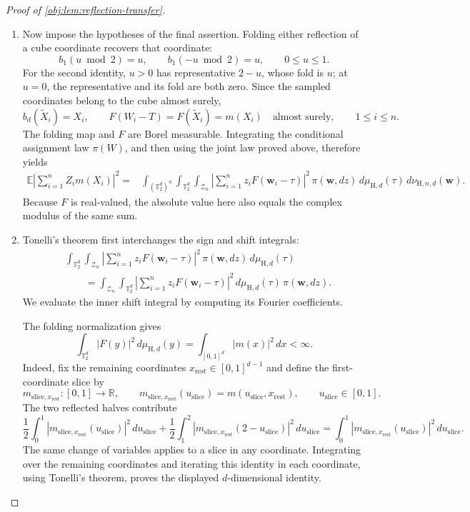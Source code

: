 \documentclass[11pt]{article}
\begin{document}
\begin{proof}[Proof of \cref{obj:lem:reflection-transfer}]
\begin{enumerate}
\item Now impose the hypotheses of the final assertion. Folding either
reflection of a cube coordinate recovers that coordinate:
\[
b_1(u\bmod2)=u,
\qquad
b_1(-u\bmod2)=u,
\qquad 0\leq u\leq1.
\]
For the second identity, \(u>0\) has representative \(2-u\), whose fold
is \(u\); at \(u=0\), the representative and its fold are both zero.
Since the sampled coordinates belong to the cube almost surely,
\[
b_d(\widetilde X_i)=X_i,
\qquad
F(W_i-T)=F(\widetilde X_i)=m(X_i)
\quad\text{almost surely},\qquad 1\leq i\leq n.
\]
The folding map and \(F\) are Borel measurable. Integrating the
conditional assignment law \(\pi(W)\), and then using the joint law
proved above, therefore yields
\[
\begin{aligned}
\mathbb E\left|\sum_{i=1}^n Z_i m(X_i)\right|^2
={}&
\int_{(\mathbb T_2^d)^n}\int_{\mathbb T_2^d}
\int_{\mathcal Z_n}
\left|\sum_{i=1}^n z_i F(\mathbf w_i-\tau)\right|^2
\,\pi(\mathbf w,dz)\,
d\mu_{\mathrm H,d}(\tau)\,
d\nu_{\mathrm H,n,d}(\mathbf w).
\end{aligned}
\]
Because \(F\) is real-valued, the absolute value here also equals the
complex modulus of the same sum.

\item Tonelli's theorem first interchanges the sign and shift integrals:
\[
\begin{aligned}
&\int_{\mathbb T_2^d}\int_{\mathcal Z_n}
\left|\sum_{i=1}^n z_i F(\mathbf w_i-\tau)\right|^2
\,\pi(\mathbf w,dz)\,d\mu_{\mathrm H,d}(\tau)\\
&\qquad=
\int_{\mathcal Z_n}\int_{\mathbb T_2^d}
\left|\sum_{i=1}^n z_i F(\mathbf w_i-\tau)\right|^2
\,d\mu_{\mathrm H,d}(\tau)\,\pi(\mathbf w,dz).
\end{aligned}
\]
We evaluate the inner shift integral by computing its Fourier
coefficients.

The folding normalization gives
\[
\int_{\mathbb T_2^d}|F(y)|^2\,d\mu_{\mathrm H,d}(y)
=\int_{[0,1]^d}|m(x)|^2\,dx<\infty.
\]
Indeed, fix the remaining coordinates
\(x_{\mathrm{rest}}\in[0,1]^{d-1}\) and define the first-coordinate slice by
\[
m_{\mathrm{slice},x_{\mathrm{rest}}}:[0,1]\to\mathbb R,
\qquad
m_{\mathrm{slice},x_{\mathrm{rest}}}(u_{\mathrm{slice}})
=m(u_{\mathrm{slice}},x_{\mathrm{rest}}),
\qquad u_{\mathrm{slice}}\in[0,1].
\]
The two reflected halves contribute
\[
\frac12\int_0^1
|m_{\mathrm{slice},x_{\mathrm{rest}}}(u_{\mathrm{slice}})|^2
\,du_{\mathrm{slice}}
+\frac12\int_1^2
|m_{\mathrm{slice},x_{\mathrm{rest}}}(2-u_{\mathrm{slice}})|^2
\,du_{\mathrm{slice}}
=\int_0^1
|m_{\mathrm{slice},x_{\mathrm{rest}}}(u_{\mathrm{slice}})|^2
\,du_{\mathrm{slice}}.
\]
The same change of variables applies to a slice in any coordinate.
Integrating over the remaining coordinates and iterating this identity
in each coordinate, using Tonelli's theorem, proves the displayed
\(d\)-dimensional identity.


\end{enumerate}
\end{proof}
\end{document}

